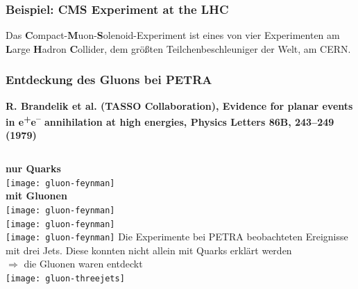 \documentclass[10pt,t]{beamer}
\begin{document}
\begin{frame}
\frametitle{Beispiel: CMS Experiment at the LHC}
\vspace*{-2.5\baselineskip}
Das \textbf{C}ompact-\textbf{M}uon-\textbf{S}olenoid-Experiment ist eines von vier Experimenten am \textbf{L}arge \textbf{H}adron \textbf{C}ollider, dem größten Teilchenbeschleuniger der Welt, am CERN. \\[\baselineskip]
\vspace*{-18pt}
\end{frame}


\begin{frame}
\frametitle{Entdeckung des Gluons bei PETRA}
\vspace*{-2.6\baselineskip}
\alert{\bfseries\footnotesize R. Brandelik et al. (TASSO Collaboration), Evidence for planar events in e\textsuperscript{+}e\textsuperscript{--} annihilation at high energies, Physics Letters 86B, 243--249 (1979) \cite{Brandelik1979}}
\vspace*{\baselineskip}
\begin{columns}
    \textbf{nur Quarks} \\
    \texttt{[image: gluon-feynman]} \\[1ex]
    \textbf{mit Gluonen} \\
    \texttt{[image: gluon-feynman]} \\
    \texttt{[image: gluon-feynman]} \\
    \texttt{[image: gluon-feynman]}
Die Experimente bei PETRA beobachteten Ereignisse mit drei Jets. Diese konnten nicht allein mit Quarks erklärt werden \\
$\Rightarrow$ die Gluonen waren entdeckt \\[1ex]
    \centering\texttt{[image: gluon-threejets]}
\end{columns}
\vspace*{-18pt}
\end{frame}
\end{document}
